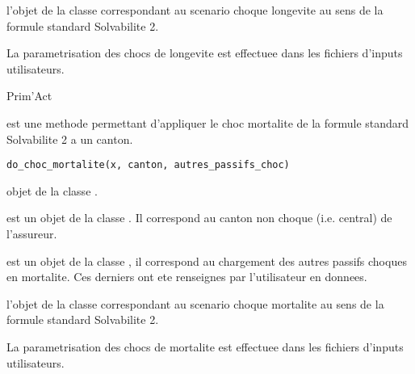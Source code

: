 \documentclass[a4paper]{book}
\begin{document}
%
\begin{Value}
 l'objet  de la classe  correspondant au scenario choque longevite
au sens de la formule standard Solvabilite 2.
\end{Value}
%
\begin{Note}\relax
La parametrisation des chocs de longevite est effectuee dans les fichiers d'inputs utilisateurs.
\end{Note}
%
\begin{Author}\relax
Prim'Act
\end{Author}
%
\begin{Description}\relax
{} est une methode permettant d'appliquer le choc mortalite de la formule standard
Solvabilite 2 a un canton.
\end{Description}
%
\begin{Usage}
\begin{verbatim}
do_choc_mortalite(x, canton, autres_passifs_choc)
\end{verbatim}
\end{Usage}
%
\begin{Arguments}
\begin{ldescription}
\item[\code{x}] objet de la classe .

\item[\code{canton}] est un objet de la classe . Il correspond au canton non choque (i.e. central)
de l'assureur.

\item[\code{autres\_passifs\_choc}] est un objet de la classe , il correspond au chargement des autres passifs choques en mortalite.
Ces derniers ont ete renseignes par l'utilisateur en donnees.
\end{ldescription}
\end{Arguments}
%
\begin{Value}
 l'objet  de la classe  correspondant au scenario choque mortalite au sens de la formule standard Solvabilite 2.
\end{Value}
%
\begin{Note}\relax
La parametrisation des chocs de mortalite est effectuee dans les fichiers d'inputs utilisateurs.
\end{Note}
\end{document}
